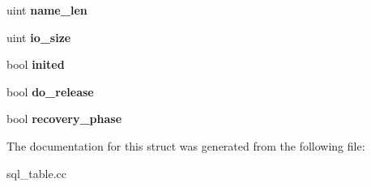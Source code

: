 \begin{DoxyCompactItemize}
\item 
\mbox{\label{structst__global__ddl__log_a2f9891e4198912b92ef1db98e58e922a}} 
uint {\bfseries name\+\_\+len}
\item 
\mbox{\label{structst__global__ddl__log_a658e576dfd5502fcd4a328adbcd1c65f}} 
uint {\bfseries io\+\_\+size}
\item 
\mbox{\label{structst__global__ddl__log_a5c4844c36940a722ca856b04b85e3592}} 
bool {\bfseries inited}
\item 
\mbox{\label{structst__global__ddl__log_af1f475477f94cbe4a10833c246c559c5}} 
bool {\bfseries do\+\_\+release}
\item 
\mbox{\label{structst__global__ddl__log_a2e17de9e3b89de186736c8bbc058f233}} 
bool {\bfseries recovery\+\_\+phase}
\end{DoxyCompactItemize}


The documentation for this struct was generated from the following file\+:\begin{DoxyCompactItemize}
\item 
sql\+\_\+table.\+cc\end{DoxyCompactItemize}
